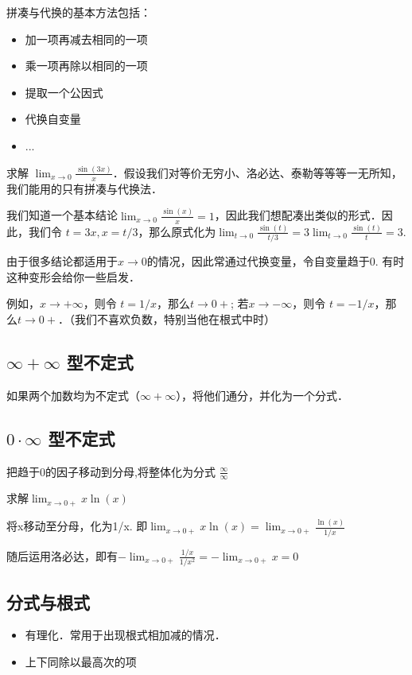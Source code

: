 拼凑与代换的基本方法包括：
\begin{itemize}
\item 加一项再减去相同的一项
\item 乘一项再除以相同的一项
\item 提取一个公因式
\item 代换自变量
\item ...
\end{itemize}

\begin{example}{}
求解 $\lim_{x \to 0} \frac{\sin(3x)}{x}$．假设我们对等价无穷小、洛必达、泰勒等等等一无所知，我们能用的只有拼凑与代换法．

我们知道一个基本结论$\lim_{x \to 0} \frac{\sin(x)}{x}=1$，因此我们想配凑出类似的形式．因此，我们令 $t=3x, x=t/3$，那么原式化为$\lim_{t \to 0} \frac{\sin(t)}{t/3}=3\lim_{t \to 0} \frac{\sin(t)}{t}=3$.
\end{example}

\begin{example}{}
由于很多结论都适用于$x\to0$的情况，因此常通过代换变量，令自变量趋于0. 有时这种变形会给你一些启发．

例如，$x\to+\infty$，则令 $t=1/x$，那么$t\to0+$; 若$x\to-\infty$，则令 $t=-1/x$，那么$t\to0+$．（我们不喜欢负数，特别当他在根式中时）
\end{example}

\subsection{$\infty+\infty$ 型不定式}
如果两个加数均为不定式（$\infty+\infty$），将他们通分，并化为一个分式．

\subsection{$0\cdot\infty$ 型不定式}
把趋于0的因子移动到分母,将整体化为分式 $\frac{\infty}{\infty}$
\begin{example}{}
求解$\lim_{x\to0+} x\ln(x)$

将x移动至分母，化为1/x. 即$\lim_{x\to0+} x\ln(x)=\lim_{x\to0+} \frac{\ln(x)}{1/x}$

随后运用洛必达，即有$-\lim_{x\to0+} \frac{1/x}{1/x^2}=-\lim_{x\to0+} x=0$
\end{example}


\subsection{分式与根式}
\begin{itemize}
\item 有理化．常用于出现根式相加减的情况．
\item 上下同除以最高次的项
\end{itemize}

